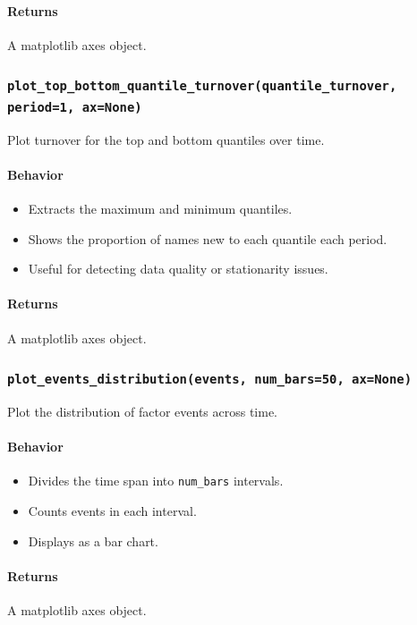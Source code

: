 \documentclass[11pt]{article}
\begin{document}
\paragraph{Returns}
A matplotlib axes object.

\subsubsection{\texttt{plot\_top\_bottom\_quantile\_turnover(quantile\_turnover, period=1, ax=None)}}
Plot turnover for the top and bottom quantiles over time.

\paragraph{Behavior}
\begin{itemize}
  \item Extracts the maximum and minimum quantiles.
  \item Shows the proportion of names new to each quantile each period.
  \item Useful for detecting data quality or stationarity issues.
\end{itemize}

\paragraph{Returns}
A matplotlib axes object.

\subsubsection{\texttt{plot\_events\_distribution(events, num\_bars=50, ax=None)}}
Plot the distribution of factor events across time.

\paragraph{Behavior}
\begin{itemize}
  \item Divides the time span into \texttt{num\_bars} intervals.
  \item Counts events in each interval.
  \item Displays as a bar chart.
\end{itemize}

\paragraph{Returns}
A matplotlib axes object.
\end{document}
